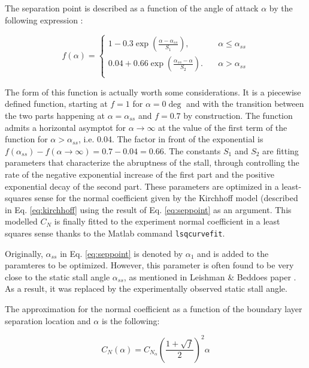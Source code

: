 The separation point is described as a function of the angle of attack $\alpha$ by the following expression : 

\begin{equation}
	f(\alpha) = 
		\begin{cases}
		1-0.3\exp(\frac{\alpha-\alpha_{ss}}{S_1}), &\quad \alpha \leq \alpha_{ss}\\
		0.04+0.66\exp(\frac{\alpha_{ss}-\alpha}{S_2}). &\quad \alpha > \alpha_{ss}\\
		\end{cases}
	\label{eq:seppoint}
\end{equation}

The form of this function is actually worth some considerations. It is a piecewise defined function, starting at $f=1$ for $\alpha=0\deg$ and with the transition between the two parts happening at $\alpha=\alpha_{ss}$ and $f=0.7$ by construction. The function admits a horizontal asymptot for $\alpha \rightarrow \infty$ at the value of the first term of the function for $\alpha > \alpha_{ss}$, i.e. 0.04. The factor in front of the exponential is $f(\alpha_{ss})-f(\alpha \rightarrow \infty)=0.7-0.04=0.66$. The constants $S_1$ and $S_2$ are fitting parameters that characterize the abruptness of the stall, through controlling the rate of the negative exponential increase of the first part and the positive exponential decay of the second part. These parameters are optimized in a least-squares sense for the normal coefficient given by the Kirchhoff model (described in Eq. \eqref{eq:kirchhoff} using the result of Eq. \eqref{eq:seppoint} as an argument. This modelled $C_N$ is finally fitted to the experiment normal coefficient in a least squares sense thanks to the Matlab command \texttt{lsqcurvefit}.

Originally, $\alpha_{ss}$ in Eq. \ref{eq:seppoint} is denoted by $\alpha_1$ and is added to the paramteres to be optimized. However, this parameter is often found to be very close to the static stall angle $\alpha_{ss}$, as mentioned in Leishman \& Beddoes paper \cite{leishman_semi-empirical_1989}. As a result, it was replaced by the experimentally observed static stall angle. 

The approximation for the normal coefficient as a function of the boundary layer separation location and $\alpha$ is the following: 

\begin{equation}
	C_N (\alpha) = C_ {N_{\alpha}} \left(\frac{1+\sqrt{f}}{2}\right)^2 \alpha
	\label{eq:kirchhoff}
\end{equation}

